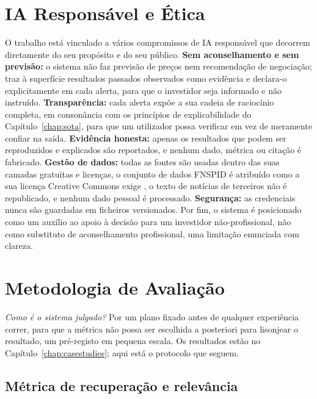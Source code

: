 \section{IA Responsável e Ética}
\label{sec:met_ethics}

O trabalho está vinculado a vários compromissos de IA responsável que decorrem diretamente do seu propósito
e do seu público. \textbf{Sem aconselhamento e sem previsão:} o sistema não faz previsão de preços nem
recomendação de negociação; traz à superfície resultados passados observados como evidência e declara-o
explicitamente em cada alerta, para que o investidor seja informado e não instruído. \textbf{Transparência:}
cada alerta expõe a sua cadeia de raciocínio completa, em consonância com os princípios de explicabilidade
do Capítulo~\ref{chap:sota}, para que um utilizador possa verificar em vez de meramente confiar na saída.
\textbf{Evidência honesta:} apenas os resultados que podem ser reproduzidos e explicados são reportados, e
nenhum dado, métrica ou citação é fabricado. \textbf{Gestão de dados:} todas as fontes são usadas dentro das
suas camadas gratuitas e licenças, o conjunto de dados FNSPID é atribuído como a sua licença Creative
Commons exige \autocite{dong2024fnspid}, o texto de notícias de terceiros não é republicado, e nenhum dado
pessoal é processado. \textbf{Segurança:} as credenciais nunca são guardadas em ficheiros versionados. Por
fim, o sistema é posicionado como um auxílio ao apoio à decisão para um investidor não-profissional, não
como substituto de aconselhamento profissional, uma limitação enunciada com clareza.

\section{Metodologia de Avaliação}
\label{sec:met_evaluation}

\emph{Como é o sistema julgado?} Por um plano fixado antes de qualquer experiência correr, para que a
métrica não possa ser escolhida a posteriori para lisonjear o resultado, um pré-registo em pequena escala.
Os resultados estão no Capítulo~\ref{chap:casestudies}; aqui está o protocolo que seguem.

\subsection{Métrica de recuperação e relevância}
\label{sec:met_eval_retrieval}


